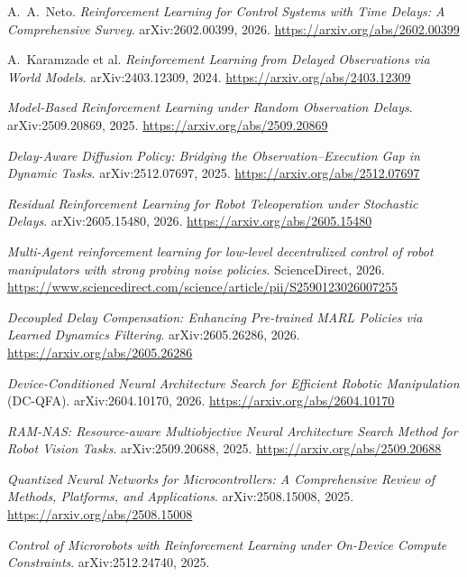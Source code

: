 \documentclass[11pt,a4paper]{article}
\begin{document}
\begingroup\sloppy
\begin{enumerate}[leftmargin=1.8em,itemsep=2pt,label={[\arabic*]}]
  \item A.~A.~Neto. \emph{Reinforcement Learning for Control Systems with Time Delays:
        A Comprehensive Survey}. arXiv:2602.00399, 2026.
        \url{https://arxiv.org/abs/2602.00399}
  \item A.~Karamzade et al. \emph{Reinforcement Learning from Delayed Observations
        via World Models}. arXiv:2403.12309, 2024.
        \url{https://arxiv.org/abs/2403.12309}
  \item \emph{Model-Based Reinforcement Learning under Random Observation Delays}.
        arXiv:2509.20869, 2025. \url{https://arxiv.org/abs/2509.20869}
  \item \emph{Delay-Aware Diffusion Policy: Bridging the Observation--Execution Gap
        in Dynamic Tasks}. arXiv:2512.07697, 2025.
        \url{https://arxiv.org/abs/2512.07697}
  \item \emph{Residual Reinforcement Learning for Robot Teleoperation under
        Stochastic Delays}. arXiv:2605.15480, 2026.
        \url{https://arxiv.org/abs/2605.15480}
  \item \emph{Multi-Agent reinforcement learning for low-level decentralized control
        of robot manipulators with strong probing noise policies}.
        ScienceDirect, 2026.
        \url{https://www.sciencedirect.com/science/article/pii/S2590123026007255}
  \item \emph{Decoupled Delay Compensation: Enhancing Pre-trained MARL Policies via
        Learned Dynamics Filtering}. arXiv:2605.26286, 2026.
        \url{https://arxiv.org/abs/2605.26286}
  \item \emph{Device-Conditioned Neural Architecture Search for Efficient Robotic
        Manipulation} (DC-QFA). arXiv:2604.10170, 2026.
        \url{https://arxiv.org/abs/2604.10170}
  \item \emph{RAM-NAS: Resource-aware Multiobjective Neural Architecture Search
        Method for Robot Vision Tasks}. arXiv:2509.20688, 2025.
        \url{https://arxiv.org/abs/2509.20688}
  \item \emph{Quantized Neural Networks for Microcontrollers: A Comprehensive Review
        of Methods, Platforms, and Applications}. arXiv:2508.15008, 2025.
        \url{https://arxiv.org/abs/2508.15008}
  \item \emph{Control of Microrobots with Reinforcement Learning under On-Device
        Compute Constraints}. arXiv:2512.24740, 2025.

\end{enumerate}
\end{document}
